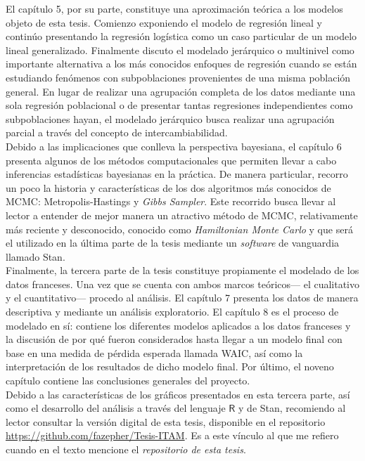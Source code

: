 El capítulo 5, por su parte, constituye una aproximación teórica a los modelos objeto de esta tesis. Comienzo exponiendo el modelo de regresión lineal y continúo presentando la regresión logística como un caso particular de un modelo lineal generalizado. Finalmente discuto el modelado jerárquico o multinivel como importante alternativa a los más conocidos enfoques de regresión cuando se están estudiando fenómenos con subpoblaciones provenientes de una misma población general. En lugar de realizar una agrupación completa de los datos mediante una sola regresión poblacional o de presentar tantas regresiones independientes como subpoblaciones hayan, el modelado jerárquico busca realizar una agrupación parcial a través del concepto de intercambiabilidad.\\

Debido a las implicaciones que conlleva la perspectiva bayesiana, el capítulo 6 presenta algunos de los métodos computacionales que permiten llevar a cabo inferencias estadísticas bayesianas en la práctica. De manera particular, recorro un poco la historia y características de los dos algoritmos más conocidos de MCMC: Metropolis-Hastings y \textit{Gibbs Sampler}. Este recorrido busca llevar al lector a entender de mejor manera un atractivo método de MCMC, relativamente más reciente y desconocido, conocido como \textit{Hamiltonian Monte Carlo} y que será el utilizado en la última parte de la tesis mediante un \textit{software} de vanguardia llamado Stan.\\

Finalmente, la tercera parte de la tesis constituye propiamente el modelado de los datos franceses. Una vez que se cuenta con ambos marcos teóricos--- el cualitativo y el cuantitativo--- procedo al análisis. El capítulo 7 presenta los datos de manera descriptiva y mediante un análisis exploratorio. El capítulo 8 es el proceso de modelado en sí: contiene los diferentes modelos aplicados a los datos franceses y la discusión de por qué fueron considerados hasta llegar a un modelo final con base en una medida de pérdida esperada llamada WAIC, así como la interpretación de los resultados de dicho modelo final. Por último, el noveno capítulo contiene las conclusiones generales del proyecto.\\ 

Debido a las características de los gráficos presentados en esta tercera parte, así como el desarrollo del análisis a través del lenguaje $\mathsf{R}$ y de Stan, recomiendo al lector consultar la versión digital de esta tesis, disponible en el repositorio \url{https://github.com/fazepher/Tesis-ITAM}. Es a este vínculo al que me refiero cuando en el texto mencione el \textit{repositorio de esta tesis}.
